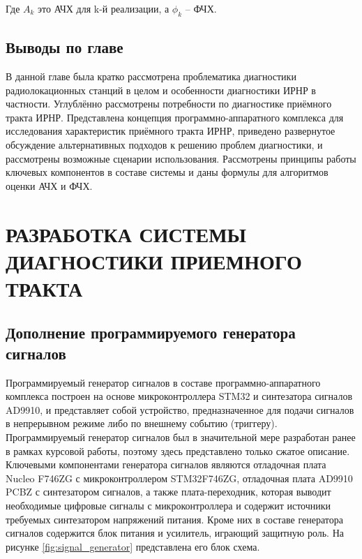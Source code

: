\documentclass{report}
\begin{document}
Где $A_k$ это АЧХ для k-й реализации, а $\phi_k$ -- ФЧХ.

\section*{Выводы по главе}

В данной главе была кратко рассмотрена проблематика диагностики радиолокационных станций в целом и особенности диагностики ИРНР в частности. Углублённо рассмотрены потребности по диагностике приёмного тракта ИРНР. Представлена концепция программно-аппаратного комплекса для исследования характеристик приёмного тракта ИРНР, приведено развернутое обсуждение альтернативных подходов к решению проблем диагностики, и рассмотрены возможные сценарии использования. Рассмотрены принципы работы ключевых компонентов в составе системы и даны формулы для алгоритмов оценки АЧХ и ФЧХ.

\chapter{РАЗРАБОТКА СИСТЕМЫ ДИАГНОСТИКИ ПРИЕМНОГО ТРАКТА}
\setcounter{section}{0}
\setcounter{subsection}{0}
\setcounter{equation}{0}
\section{Дополнение программируемого генератора сигналов}

Программируемый генератор сигналов в составе программно-аппаратного комплекса построен на основе микроконтроллера STM32 и синтезатора сигналов AD9910, и представляет собой устройство, предназначенное для подачи сигналов в непрерывном режиме либо по внешнему событию (триггеру). Программируемый генератор сигналов был в значительной мере разработан ранее в рамках курсовой работы, поэтому здесь представлено только сжатое описание. Ключевыми компонентами генератора сигналов являются отладочная плата Nucleo F746ZG с микроконтроллером STM32F746ZG, отладочная плата AD9910 PCBZ с синтезатором сигналов, а также плата-переходник, которая выводит необходимые цифровые сигналы с микроконтроллера и содержит источники требуемых синтезатором напряжений питания. Кроме них в составе генератора сигналов содержится блок питания и усилитель, играющий защитную роль. На рисунке \ref{fig:signal_generator} представлена его блок схема.

\end{document}
